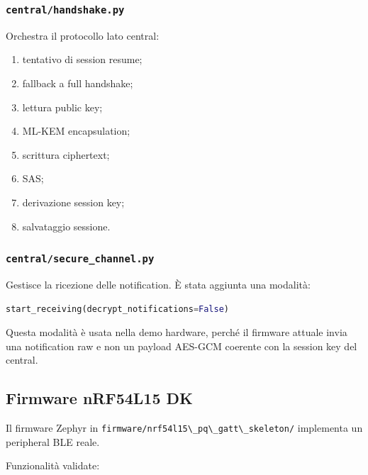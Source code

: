\documentclass[11pt,a4paper]{article}
\providecommand{\tightlist}{\setlength{\itemsep}{0pt}\setlength{\parskip}{0pt}}
\newcommand{\passthrough}[1]{#1}
\begin{document}
\subsubsection{\texorpdfstring{\texttt{central/handshake.py}}{central/handshake.py}}\label{centralhandshake.py}

Orchestra il protocollo lato central:

\begin{enumerate}
\def\labelenumi{\arabic{enumi}.}
\tightlist
\item
  tentativo di session resume;
\item
  fallback a full handshake;
\item
  lettura public key;
\item
  ML-KEM encapsulation;
\item
  scrittura ciphertext;
\item
  SAS;
\item
  derivazione session key;
\item
  salvataggio sessione.
\end{enumerate}

\subsubsection{\texorpdfstring{\texttt{central/secure\_channel.py}}{central/secure\_channel.py}}\label{centralsecure_channel.py}

Gestisce la ricezione delle notification. È stata aggiunta una modalità:

\begin{lstlisting}[language=Python]
start_receiving(decrypt_notifications=False)
\end{lstlisting}

Questa modalità è usata nella demo hardware, perché il firmware attuale
invia una notification raw e non un payload AES-GCM coerente con la
session key del central.

\subsection{Firmware nRF54L15 DK}\label{firmware-nrf54l15-dk}

Il firmware Zephyr in
\passthrough{\lstinline!firmware/nrf54l15\_pq\_gatt\_skeleton/!}
implementa un peripheral BLE reale.

Funzionalità validate:
\end{document}
